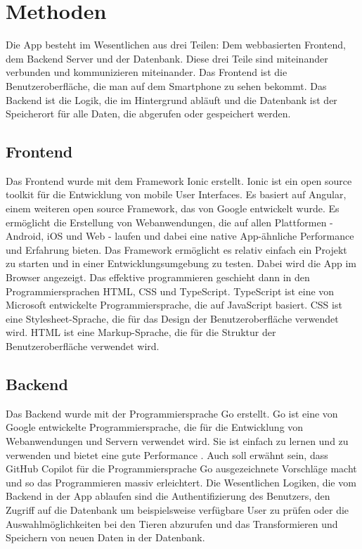 \documentclass{article}
\begin{document}
\section{Methoden} %

Die App besteht im Wesentlichen aus drei Teilen: Dem webbasierten Frontend, dem Backend Server und der Datenbank.
Diese drei Teile sind miteinander verbunden und kommunizieren miteinander. Das Frontend ist die Benutzeroberfläche,
die man auf dem Smartphone zu sehen bekommt. Das Backend ist die Logik, die im Hintergrund abläuft und die Datenbank
ist der Speicherort für alle Daten, die abgerufen oder gespeichert werden.

\subsection{Frontend} %

Das Frontend wurde mit dem Framework Ionic erstellt. Ionic ist ein open source toolkit für die Entwicklung von
mobile User Interfaces. Es basiert auf Angular, einem weiteren open source Framework, das von Google entwickelt wurde.
Es ermöglicht die Erstellung von Webanwendungen, die auf allen Plattformen - Android, iOS und Web - laufen und dabei
eine native App-ähnliche Performance und Erfahrung bieten. \autocite{IonicFrameworkCrossPlatform}
Das Framework ermöglicht es relativ einfach ein Projekt zu starten und in einer Entwicklungsumgebung zu testen.
Dabei wird die App im Browser angezeigt. Das effektive programmieren geschieht dann in den Programmiersprachen
HTML, CSS und TypeScript. TypeScript ist eine von Microsoft entwickelte Programmiersprache, die auf JavaScript basiert.
CSS ist eine Stylesheet-Sprache, die für das Design der Benutzeroberfläche verwendet wird. HTML ist eine Markup-Sprache,
die für die Struktur der Benutzeroberfläche verwendet wird.

\subsection{Backend} %

Das Backend wurde mit der Programmiersprache Go erstellt. Go ist eine von Google entwickelte Programmiersprache,
die für die Entwicklung von Webanwendungen und Servern verwendet wird. Sie ist einfach zu lernen und zu verwenden
und bietet eine gute Performance \autocite{GoProgrammingLanguage}. Auch soll erwähnt sein, dass GitHub Copilot
für die Programmiersprache Go ausgezeichnete Vorschläge macht und so das Programmieren massiv erleichtert.
Die Wesentlichen Logiken, die vom Backend in der App ablaufen sind die Authentifizierung des Benutzers, den Zugriff
auf die Datenbank um beispielsweise verfügbare User zu prüfen oder die Auswahlmöglichkeiten bei den Tieren abzurufen
und das Transformieren und Speichern von neuen Daten in der Datenbank.
\end{document}
